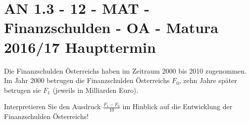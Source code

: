 \section{AN 1.3 - 12 - MAT - Finanzschulden - OA - Matura 2016/17 Haupttermin}

\begin{beispiel}[AN 1.3]{1} %
Die Finanzschulden Österreichs haben im Zeitraum 2000 bis 2010 zugenommen. Im Jahr 2000
betrugen die Finanzschulden Österreichs $F_0$, zehn Jahre später betrugen sie $F_1$ (jeweils in Milliarden Euro). \leer

Interpretieren Sie den Ausdruck $\frac{F_1-F_0}{10}$ im Hinblick auf die Entwicklung der Finanzschulden Österreichs!

\end{beispiel}
